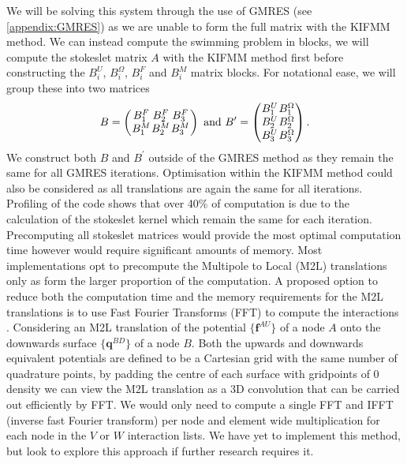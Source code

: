 We will be solving this system through the use of GMRES (see \cref{appendix:GMRES}) as we are unable to form the full matrix with the KIFMM method. We can instead compute the swimming problem in blocks, we will compute the stokeslet matrix $A$ with the KIFMM method first before constructing the $B_i^U$, $B_i^\Omega$, $B_i^F$ and $B_i^M$ matrix blocks. For notational ease, we will group these into two matrices
\begin{equation*}
\arraycolsep=0.4pt\def\arraystretch{1}
B = \left( \begin{array}{ccc}
B_{1}^{F} & B_{2}^{F} & B_{3}^{F} \\
B_{1}^{M} & B_{2}^{M} & B_{3}^{M}
\end{array}\right) \text{ and }
B^\prime = \left(\begin{array}{cc}
B_{1}^{U} & B_{1}^{\Omega} \\
B_{2}^{U} & B_{2}^{\Omega} \\
B_{3}^{U} & B_{3}^{\Omega} \\
\end{array}\right).
\end{equation*} 
We construct both $B$ and $B^\prime$ outside of the GMRES method as they remain the same for all GMRES iterations. Optimisation within the KIFMM method could also be considered as all translations are again the same for all iterations. Profiling of the code shows that over 40\% of computation is due to the calculation of the stokeslet kernel which remain the same for each iteration. Precomputing all stokeslet matrices would provide the most optimal computation time however would require significant amounts of memory. Most implementations opt to precompute the Multipole to Local (M2L) translations only as form the larger proportion of the computation. A proposed option to reduce both the computation time and the memory requirements for the M2L translations is to use Fast Fourier Transforms (FFT) to compute the interactions \cite{Ying2004}. Considering an M2L translation of the potential $\{\bm{f}^{AU}\}$ of a node $A$ onto the downwards surface $\{\bm{q}^{BD}\}$ of a node $B$. Both the upwards and downwards equivalent potentials are defined to be a Cartesian grid with the same number of quadrature points, by padding the centre of each surface with gridpoints of $0$ density we can view the M2L translation as a 3D convolution that can be carried out efficiently by FFT. We would only need to compute a single FFT and IFFT (inverse fast Fourier transform) per node and element wide multiplication for each node in the $V$ or $W$ interaction lists. We have yet to implement this method, but look to explore this approach if further research requires it.

